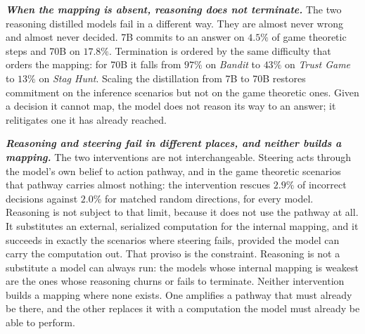 \textbf{\textit{When the mapping is absent, reasoning does not terminate.}}
The two reasoning distilled models fail in a different way. They are almost
never wrong and almost never decided.  7B commits to an answer
on \(4.5\%\) of game theoretic steps and  70B on \(17.8\%\).
Termination is ordered by the same difficulty that orders the mapping: for
 70B it falls from \(97\%\) on \textit{Bandit} to \(43\%\) on
\textit{Trust Game} to \(13\%\) on \textit{Stag Hunt}. Scaling the distillation
from 7B to 70B restores commitment on the inference scenarios but not on the
game theoretic ones. Given a decision it cannot map, the model does not reason
its way to an answer; it relitigates one it has already reached.

\textbf{\textit{Reasoning and steering fail in different places, and neither
builds a mapping.}}
The two interventions are not interchangeable. Steering acts through the
model's own belief to action pathway, and in the game theoretic scenarios that
pathway carries almost nothing: the intervention rescues \(2.9\%\) of incorrect
decisions against \(2.0\%\) for matched random directions, for every model.
Reasoning is not subject to that limit, because it does not use the pathway at
all. It substitutes an external, serialized computation for the internal
mapping, and it succeeds in exactly the scenarios where steering fails,
provided the model can carry the computation out. That proviso is the
constraint. Reasoning is not a substitute a model can always run: the models
whose internal mapping is weakest are the ones whose reasoning churns or fails
to terminate. Neither intervention builds a mapping where none exists. One
amplifies a pathway that must already be there, and the other replaces it with
a computation the model must already be able to perform.

